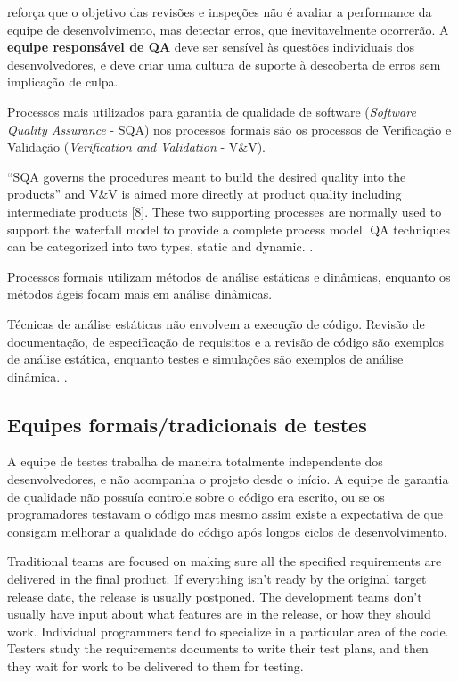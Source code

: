 \documentclass[
	12pt,				%
	openright,			%
	oneside,			%
	a4paper,			%
	english,			%
	brazil,				%
	]{abntex2}
\begin{document}
 reforça que o objetivo das revisões e inspeções não é avaliar a performance da equipe de desenvolvimento, mas detectar erros, que inevitavelmente ocorrerão. A \textbf{equipe responsável de QA} deve ser sensível às questões individuais dos desenvolvedores, e deve criar uma cultura de suporte à descoberta de erros sem implicação de culpa.


Processos mais utilizados para garantia de qualidade de software (\emph{Software Quality Assurance} - SQA) nos processos formais são os processos de Verificação e Validação (\emph{Verification and Validation} - V\&V).

“SQA governs the procedures meant to build the desired quality into the products” and V\&V is aimed
more directly at product quality including intermediate products [8]. These two supporting processes are normally used to support the waterfall model to provide a complete process model. QA techniques can be categorized into two types, static and dynamic. \cite{Huo:2004:SQA:1025117.1025549}. %

Processos formais utilizam métodos de análise estáticas e dinâmicas, enquanto os métodos ágeis focam mais em análise dinâmicas.

Técnicas de análise estáticas não envolvem a execução de código. Revisão de documentação, de especificação de requisitos e a revisão de código são exemplos de análise estática, enquanto testes e simulações são exemplos de análise dinâmica. \cite{Huo:2004:SQA:1025117.1025549}. %

\subsection{Equipes formais/tradicionais de testes}
A equipe de testes trabalha de maneira totalmente independente dos desenvolvedores, e não acompanha o projeto desde o início. A equipe de garantia de qualidade não possuía controle sobre o código era escrito, ou se os programadores testavam o código mas mesmo assim existe a expectativa de que consigam melhorar a qualidade do código após longos ciclos de desenvolvimento.

Traditional teams are focused on making sure all the specified requirements are delivered in the final product. If everything isn’t ready by the original target release date, the release is usually postponed. The development teams don’t usually have input about what features are in the release, or how they should work. Individual programmers tend to specialize in a particular area of the code. Testers study the requirements documents to write their test plans, and then they wait for work to be delivered to them for testing.
\end{document}
